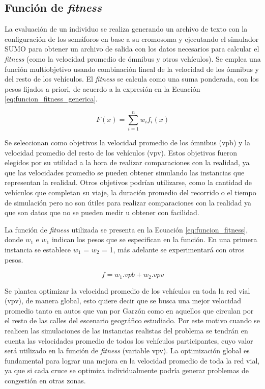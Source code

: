 \subsection{Función de \emph{fitness}}

La evaluación de un individuo se realiza generando un archivo de texto con la configuración de los semáforos en base a su cromosoma y ejecutando el simulador SUMO para obtener un archivo de salida con los datos necesarios para calcular el \emph{fitness} (como la velocidad promedio de ómnibus y otros vehículos). Se emplea una función multiobjetivo usando combinación lineal de la velocidad de los ómnibus y del resto de los vehículos.
El \emph{fitness} se calcula como una suma ponderada, con los pesos fijados a priori, de acuerdo a la expresión en la Ecuación \ref{eq:funcion_fitness_generica}.

\begin{equation}
\label{eq:funcion_fitness_generica}
F(x) = \sum_{i=1}^{n}{w_i}{f_i}(x)
\end{equation}

Se seleccionan como objetivos la velocidad promedio de los ómnibus (vpb) y la velocidad promedio del resto de los vehículos (vpv). Estos objetivos fueron elegidos por su utilidad a la hora de realizar comparaciones con la realidad, ya que las velocidades promedio se pueden obtener simulando las instancias que representan la realidad. Otros objetivos podrían utilizarse, como la cantidad de vehículos que completan su viaje, la duración promedio del recorrido o el tiempo de simulación pero no son útiles para realizar comparaciones con la realidad ya que son datos que no se pueden medir u obtener con facilidad.

La función de \emph{fitness} utilizada se presenta en la Ecuación \ref{eq:funcion_fitness}, donde \emph{$w_1$} e \emph{$w_1$} indican los pesos que se especifican en la función. En una primera instancia se establece $w_1$ = $w_2$ = 1, más adelante se experimentará con otros pesos.

\begin{equation}
\label{eq:funcion_fitness}
f = w_1.vpb + w_2.vpv
\end{equation}



Se plantea optimizar la velocidad promedio de los vehículos en toda la red vial (vpv), de manera global, esto quiere decir que se busca una mejor velocidad promedio tanto en autos que van por Garzón como en aquellos que circulan por el resto de las calles del escenario geográfico estudiado. Por este motivo cuando se realicen las simulaciones de las instancias realistas del problema se tendrán en cuenta las velocidades promedio de todos los vehículos participantes, cuyo valor será utilizado en la función de \emph{fitness} (variable vpv). La optimización global es fundamental para lograr una mejora en la velocidad promedio de toda la red vial, ya que si cada cruce se optimiza individualmente podría generar problemas de congestión en otras zonas.

